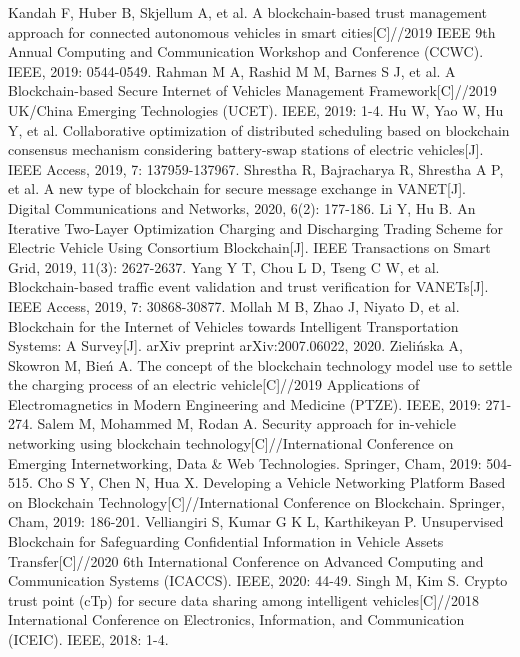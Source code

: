 \begin{thebibliography}{99}
 Kandah F, Huber B, Skjellum A, et al. A blockchain-based trust management approach for connected autonomous vehicles in smart cities[C]//2019 IEEE 9th Annual Computing and Communication Workshop and Conference (CCWC). IEEE, 2019: 0544-0549.
 Rahman M A, Rashid M M, Barnes S J, et al. A Blockchain-based Secure Internet of Vehicles Management Framework[C]//2019 UK/China Emerging Technologies (UCET). IEEE, 2019: 1-4.
 Hu W, Yao W, Hu Y, et al. Collaborative optimization of distributed scheduling based on blockchain consensus mechanism considering battery-swap stations of electric vehicles[J]. IEEE Access, 2019, 7: 137959-137967.
 Shrestha R, Bajracharya R, Shrestha A P, et al. A new type of blockchain for secure message exchange in VANET[J]. Digital Communications and Networks, 2020, 6(2): 177-186.
 Li Y, Hu B. An Iterative Two-Layer Optimization Charging and Discharging Trading Scheme for Electric Vehicle Using Consortium Blockchain[J]. IEEE Transactions on Smart Grid, 2019, 11(3): 2627-2637.
 Yang Y T, Chou L D, Tseng C W, et al. Blockchain-based traffic event validation and trust verification for VANETs[J]. IEEE Access, 2019, 7: 30868-30877.
 Mollah M B, Zhao J, Niyato D, et al. Blockchain for the Internet of Vehicles towards Intelligent Transportation Systems: A Survey[J]. arXiv preprint arXiv:2007.06022, 2020.
 Zielińska A, Skowron M, Bień A. The concept of the blockchain technology model use to settle the charging process of an electric vehicle[C]//2019 Applications of Electromagnetics in Modern Engineering and Medicine (PTZE). IEEE, 2019: 271-274.
 Salem M, Mohammed M, Rodan A. Security approach for in-vehicle networking using blockchain technology[C]//International Conference on Emerging Internetworking, Data & Web Technologies. Springer, Cham, 2019: 504-515.
 Cho S Y, Chen N, Hua X. Developing a Vehicle Networking Platform Based on Blockchain Technology[C]//International Conference on Blockchain. Springer, Cham, 2019: 186-201.
 Velliangiri S, Kumar G K L, Karthikeyan P. Unsupervised Blockchain for Safeguarding Confidential Information in Vehicle Assets Transfer[C]//2020 6th International Conference on Advanced Computing and Communication Systems (ICACCS). IEEE, 2020: 44-49.
 Singh M, Kim S. Crypto trust point (cTp) for secure data sharing among intelligent vehicles[C]//2018 International Conference on Electronics, Information, and Communication (ICEIC). IEEE, 2018: 1-4.

\end{thebibliography}

